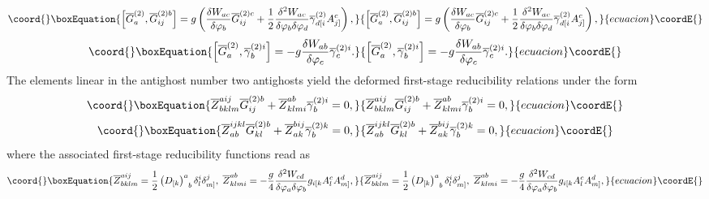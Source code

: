 \documentclass[a4paper,12pt]{article}
\begin{document}
\begin{equation}\coord{}\boxEquation{
\left[ \overline{G}_{a}^{(2)},\overline{G}_{ij}^{(2)b}\right] =g\left( \frac{
\delta W_{ac}}{\delta \varphi _{b}}\overline{G}_{ij}^{(2)c}+\frac{1}{2}\frac{
\delta ^{2}W_{ac}}{\delta \varphi _{b}\delta \varphi _{d}}\overline{\gamma }
_{d[i}^{(2)}A_{j]}^{c}\right) ,  \label{xx101}
}{
\left[ \overline{G}_{a}^{(2)},\overline{G}_{ij}^{(2)b}\right] =g\left( \frac{
\delta W_{ac}}{\delta \varphi _{b}}\overline{G}_{ij}^{(2)c}+\frac{1}{2}\frac{
\delta ^{2}W_{ac}}{\delta \varphi _{b}\delta \varphi _{d}}\overline{\gamma }
_{d[i}^{(2)}A_{j]}^{c}\right) ,  }{ecuacion}\coordE{}\end{equation}
\begin{equation}\coord{}\boxEquation{
\left[ \overline{G}_{a}^{(2)},\overline{\gamma }_{b}^{(2)i}\right] =-g\frac{
\delta W_{ab}}{\delta \varphi _{c}}\overline{\gamma }_{c}^{(2)i}.
\label{xx102}
}{
\left[ \overline{G}_{a}^{(2)},\overline{\gamma }_{b}^{(2)i}\right] =-g\frac{
\delta W_{ab}}{\delta \varphi _{c}}\overline{\gamma }_{c}^{(2)i}.
}{ecuacion}\coordE{}\end{equation}
The elements linear in the antighost number two antighosts yield the
deformed first-stage reducibility relations under the form 
\begin{equation}\coord{}\boxEquation{
\overline{Z}_{bklm}^{aij}\overline{G}_{ij}^{(2)b}+\overline{Z}_{klmi}^{ab}
\overline{\gamma }_{b}^{(2)i}=0,  \label{xx103}
}{
\overline{Z}_{bklm}^{aij}\overline{G}_{ij}^{(2)b}+\overline{Z}_{klmi}^{ab}
\overline{\gamma }_{b}^{(2)i}=0,  }{ecuacion}\coordE{}\end{equation}
\begin{equation}\coord{}\boxEquation{
\overline{Z}_{ab}^{ijkl}\overline{G}_{kl}^{(2)b}+\overline{Z}_{ak}^{bij}
\overline{\gamma }_{b}^{(2)k}=0,  \label{xx104}
}{
\overline{Z}_{ab}^{ijkl}\overline{G}_{kl}^{(2)b}+\overline{Z}_{ak}^{bij}
\overline{\gamma }_{b}^{(2)k}=0,  }{ecuacion}\coordE{}\end{equation}
where the associated first-stage reducibility functions read as 
\begin{equation}\coord{}\boxEquation{
\overline{Z}_{bklm}^{aij}=\frac{1}{2}\left( D_{[k}\right) _{\;\;b}^{a}\delta
_{l}^{i}\delta _{m]}^{j},\;\overline{Z}_{klmi}^{ab}=-\frac{g}{4}\frac{\delta
^{2}W_{cd}}{\delta \varphi _{a}\delta \varphi _{b}}
g_{i[k}A_{l}^{c}A_{m]}^{d},  \label{xx105}
}{
\overline{Z}_{bklm}^{aij}=\frac{1}{2}\left( D_{[k}\right) _{\;\;b}^{a}\delta
_{l}^{i}\delta _{m]}^{j},\;\overline{Z}_{klmi}^{ab}=-\frac{g}{4}\frac{\delta
^{2}W_{cd}}{\delta \varphi _{a}\delta \varphi _{b}}
g_{i[k}A_{l}^{c}A_{m]}^{d},  }{ecuacion}\coordE{}\end{equation}
\end{document}

